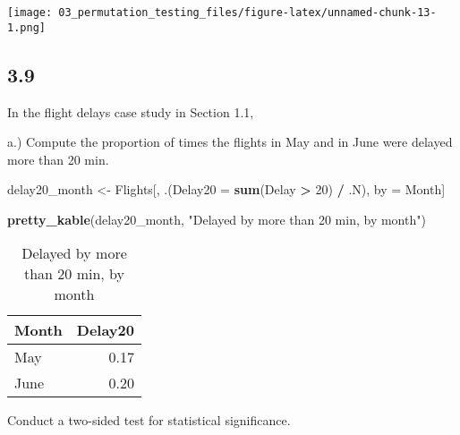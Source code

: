 \documentclass[
  12pt,
]{report}
\newenvironment{Shaded}{\begin{snugshade}}{\end{snugshade}}
\newcommand{\DataTypeTok}[1]{\textcolor[rgb]{0.13,0.29,0.53}{#1}}
\newcommand{\DecValTok}[1]{\textcolor[rgb]{0.00,0.00,0.81}{#1}}
\newcommand{\KeywordTok}[1]{\textcolor[rgb]{0.13,0.29,0.53}{\textbf{#1}}}
\newcommand{\NormalTok}[1]{#1}
\newcommand{\OperatorTok}[1]{\textcolor[rgb]{0.81,0.36,0.00}{\textbf{#1}}}
\newcommand{\StringTok}[1]{\textcolor[rgb]{0.31,0.60,0.02}{#1}}
\begin{document}
\texttt{[image: 03\_permutation\_testing\_files/figure-latex/unnamed-chunk-13-1.png]}

\hypertarget{section-8}{%
\subsection{3.9}\label{section-8}}

In the flight delays case study in Section 1.1,

a.) Compute the proportion of times the flights in May and in June were
delayed more than 20 min.

\begin{Shaded}
\begin{Highlighting}[]
\NormalTok{delay20_month <-}\StringTok{ }\NormalTok{Flights[, .(}\DataTypeTok{Delay20 =} \KeywordTok{sum}\NormalTok{(Delay }\OperatorTok{>}\StringTok{ }\DecValTok{20}\NormalTok{) }\OperatorTok{/}\StringTok{ }\NormalTok{.N), by =}\StringTok{ }\NormalTok{Month]}

\KeywordTok{pretty_kable}\NormalTok{(delay20_month, }\StringTok{"Delayed by more than 20 min, by month"}\NormalTok{)}
\end{Highlighting}
\end{Shaded}

\begin{table}[!h]

\caption{\label{tab:unnamed-chunk-14}Delayed by more than 20 min, by month}
\centering
\begin{tabular}[t]{l|r}
\hline
Month & Delay20\\
\hline
May & 0.17\\
\hline
June & 0.20\\
\hline
\end{tabular}
\end{table}

Conduct a two-sided test for statistical significance.
\end{document}
